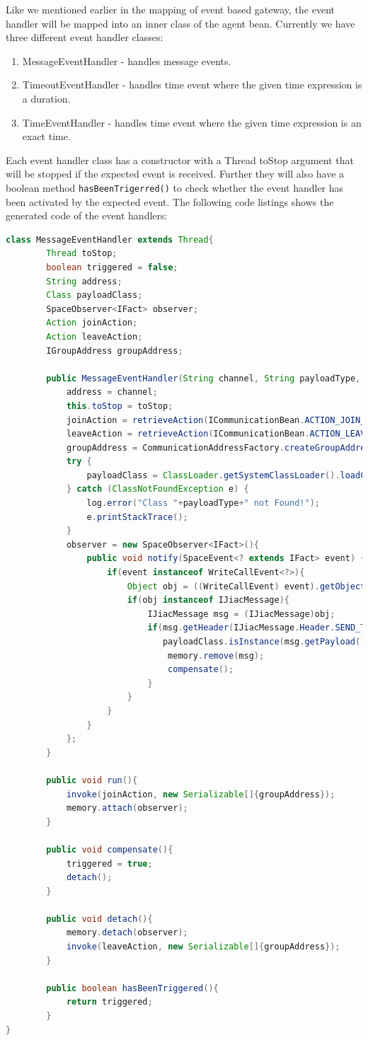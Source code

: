 Like we mentioned earlier in the mapping of event based gateway, the event handler will be mapped into an inner class of the agent bean. Currently we have three different event handler classes:
\begin{enumerate}
	\item MessageEventHandler - handles message events.
	\item TimeoutEventHandler - handles time event where the given time expression is a duration.
	\item TimeEventHandler    - handles time event where the given time expression is an exact time.   
\end{enumerate}
Each event handler class has a constructor with a Thread toStop argument that will be stopped if the expected event is received. Further they will also have a boolean method \verb|hasBeenTrigerred()| to check whether the event handler has been activated by the expected event. The following code listings shows the generated code of the event handlers:\\

\begin{lstlisting}[language=Java , caption=MessageEventHandler implementation]
class MessageEventHandler extends Thread{
		Thread toStop;
		boolean triggered = false;
		String address;
		Class payloadClass;
		SpaceObserver<IFact> observer;
		Action joinAction;
		Action leaveAction;
		IGroupAddress groupAddress;
		
		public MessageEventHandler(String channel, String payloadType, Thread toStop){
			address = channel;
			this.toStop = toStop;
			joinAction = retrieveAction(ICommunicationBean.ACTION_JOIN_GROUP);
			leaveAction = retrieveAction(ICommunicationBean.ACTION_LEAVE_GROUP);
			groupAddress = CommunicationAddressFactory.createGroupAddress(address);
			try {
				payloadClass = ClassLoader.getSystemClassLoader().loadClass(payloadType);
			} catch (ClassNotFoundException e) {
				log.error("Class "+payloadType+" not Found!");
				e.printStackTrace();
			} 
			observer = new SpaceObserver<IFact>(){
				public void notify(SpaceEvent<? extends IFact> event) {
					if(event instanceof WriteCallEvent<?>){
						Object obj = ((WriteCallEvent) event).getObject();
						if(obj instanceof IJiacMessage){
							IJiacMessage msg = (IJiacMessage)obj;
							if(msg.getHeader(IJiacMessage.Header.SEND_TO).equals(address) &&
							   payloadClass.isInstance(msg.getPayload())){
								memory.remove(msg);
								compensate();
							}
						}
					}
				}
			};		
		}
		
		public void run(){
			invoke(joinAction, new Serializable[]{groupAddress});
			memory.attach(observer);
		}
		
		public void compensate(){
			triggered = true;
			detach();
		}
		
		public void detach(){
			memory.detach(observer);
			invoke(leaveAction, new Serializable[]{groupAddress});
		}
		
		public boolean hasBeenTriggered(){
			return triggered;
		}
}
\end{lstlisting}
                                 

